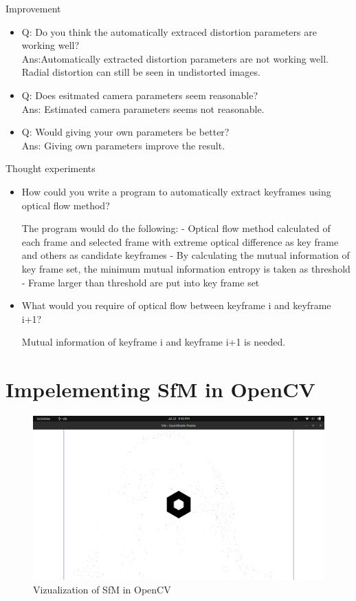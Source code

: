 \documentclass[a4paper, 12pt]{article}
\begin{document}
	Improvement
	\begin{itemize}
		\item Q: Do you think the automatically extraced distortion parameters are working well? \\ Ans:Automatically extracted distortion parameters are not working well. Radial distortion can still be seen in undistorted images.
		\item Q: Does esitmated camera parameters seem reasonable? \\ Ans: Estimated camera parameters seems not reasonable.
		\item Q: Would giving your own parameters be better? \\ Ans: Giving own parameters improve the result.
	\end{itemize}

	Thought experiments
	\begin{itemize}
		\item 
		How could you write a program to automatically extract keyframes using optical flow method?

		The program would do the following:
		- Optical flow method calculated of each frame and selected frame with extreme optical difference as key frame and others as candidate keyframes
		- By calculating the mutual information of key frame set,  the minimum mutual information entropy is taken as threshold
		- Frame larger than threshold are put into key frame set

		\item 
		What would you require of optical flow between keyframe i and keyframe i+1?

		Mutual information of keyframe i and keyframe i+1 is needed.
	\end{itemize}

	\section{Impelementing SfM in OpenCV}

	\begin{figure}
		\caption{Vizualization of SfM in OpenCV}
		\includegraphics[scale=0.25]{images/opencv_sfm01.png}
	\end{figure}
\end{document}

